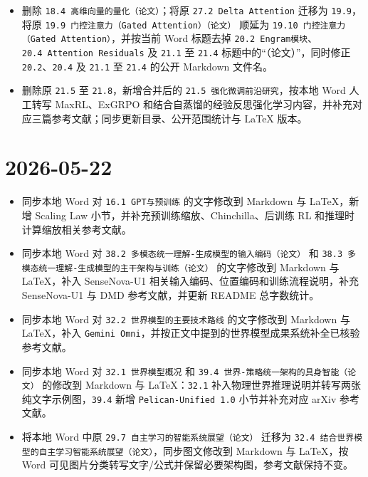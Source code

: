 \begin{itemize}
\item
  删除 \texttt{18.4\ 高维向量的量化（论文）}；将原 \texttt{27.2\ Delta\ Attention} 迁移为 \texttt{19.9}，将原 \texttt{19.9\ 门控注意力（Gated\ Attention）（论文）} 顺延为 \texttt{19.10\ 门控注意力（Gated\ Attention）}，并按当前 Word 标题去掉 \texttt{20.2\ Engram模块}、\texttt{20.4\ Attention\ Residuals} 及 \texttt{21.1} 至 \texttt{21.4} 标题中的``（论文）''，同时修正 \texttt{20.2}、\texttt{20.4} 及 \texttt{21.1} 至 \texttt{21.4} 的公开 Markdown 文件名。
\item
  删除原 \texttt{21.5} 至 \texttt{21.8}，新增合并后的 \texttt{21.5\ 强化微调前沿研究}，按本地 Word 人工转写 MaxRL、ExGRPO 和结合自蒸馏的经验反思强化学习内容，并补充对应三篇参考文献；同步更新目录、公开范围统计与 LaTeX 版本。
\end{itemize}

\hypertarget{section-2}{%
\section{2026-05-22}\label{section-2}}

\begin{itemize}
\tightlist
\item
  同步本地 Word 对 \texttt{16.1\ GPT与预训练} 的文字修改到 Markdown 与 LaTeX，新增 Scaling Law 小节，并补充预训练缩放、Chinchilla、后训练 RL 和推理时计算缩放相关参考文献。
\item
  同步本地 Word 对 \texttt{38.2\ 多模态统一理解-生成模型的输入编码（论文）} 和 \texttt{38.3\ 多模态统一理解-生成模型的主干架构与训练（论文）} 的文字修改到 Markdown 与 LaTeX，补入 SenseNova-U1 相关输入编码、位置编码和训练流程说明，补充 SenseNova-U1 与 DMD 参考文献，并更新 README 总字数统计。
\item
  同步本地 Word 对 \texttt{32.2\ 世界模型的主要技术路线} 的文字修改到 Markdown 与 LaTeX，补入 \texttt{Gemini\ Omni}，并按正文中提到的世界模型成果系统补全已核验参考文献。
\item
  同步本地 Word 对 \texttt{32.1\ 世界模型概况} 和 \texttt{39.4\ 世界-策略统一架构的具身智能（论文）} 的修改到 Markdown 与 LaTeX：\texttt{32.1} 补入物理世界推理说明并转写两张纯文字示例图，\texttt{39.4} 新增 \texttt{Pelican-Unified\ 1.0} 小节并补充对应 arXiv 参考文献。
\item
  将本地 Word 中原 \texttt{29.7\ 自主学习的智能系统展望（论文）} 迁移为 \texttt{32.4\ 结合世界模型的自主学习智能系统展望（论文）}，同步图文修改到 Markdown 与 LaTeX，按 Word 可见图片分类转写文字/公式并保留必要架构图，参考文献保持不变。
\end{itemize}

